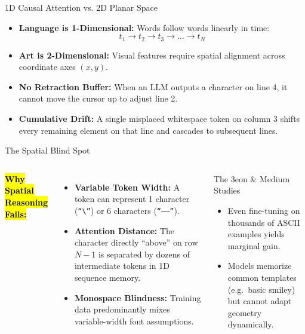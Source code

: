 \documentclass[aspectratio=169,11pt,xcolor={table,dvipsnames}]{beamer}
\begin{document}
\begin{frame}{1D Causal Attention vs. 2D Planar Space}
  \begin{itemize}
    \item \textbf{Language is 1-Dimensional:} Words follow words linearly in time:
      \[
        t_1 \longrightarrow t_2 \longrightarrow t_3 \longrightarrow \dots \longrightarrow t_N
      \]
    \item \textbf{Art is 2-Dimensional:} Visual features require spatial alignment across coordinate axes $(x, y)$.
    \item \textbf{No Retraction Buffer:} When an LLM outputs a character on line 4, it cannot move the cursor up to adjust line 2.
    \item \textbf{Cumulative Drift:} A single misplaced whitespace token on column 3 shifts every remaining element on that line and cascades to subsequent lines.
  \end{itemize}
\end{frame}

\begin{frame}{The Spatial Blind Spot}
  \begin{columns}[T]
      \textbf{\hl{Why Spatial Reasoning Fails:}}
      \begin{itemize}
        \item \textbf{Variable Token Width:} A token can represent 1 character (\texttt{``\textbackslash{}''}) or 6 characters (\texttt{``------''}).
        \item \textbf{Attention Distance:} The character directly ``above'' on row $N-1$ is separated by dozens of intermediate tokens in 1D sequence memory.
        \item \textbf{Monospace Blindness:} Training data predominantly mixes variable-width font assumptions.
      \end{itemize}

      \begin{block}{The 3eon \& Medium Studies}
        \small
        \begin{itemize}
          \item Even fine-tuning on thousands of ASCII examples yields marginal gain.
          \item Models memorize common templates (e.g.\ basic smiley) but cannot adapt geometry dynamically.
        \end{itemize}
      \end{block}
      \vspace{0.25cm}
      \footnotesize{}
  \end{columns}
\end{frame}
\end{document}
